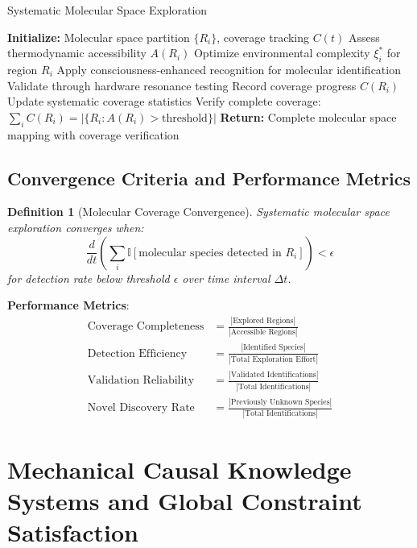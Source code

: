 \documentclass[11pt,a4paper]{article}
\newtheorem{definition}[theorem]{Definition}
\theoremstyle{remark}
\begin{document}
\begin{algorithm}
\caption{Systematic Molecular Space Exploration}
\begin{algorithmic}[1]
\State \textbf{Initialize:} Molecular space partition $\{R_i\}$, coverage tracking $C(t)$
    \State Assess thermodynamic accessibility $A(R_i)$
        \State Optimize environmental complexity $\xi_i^*$ for region $R_i$
        \State Apply consciousness-enhanced recognition for molecular identification
        \State Validate through hardware resonance testing
        \State Record coverage progress $C(R_i)$
    \EndIf
    \State Update systematic coverage statistics
\EndFor
\State Verify complete coverage: $\sum_i C(R_i) = |\{R_i : A(R_i) > \text{threshold}\}|$
\State \textbf{Return:} Complete molecular space mapping with coverage verification
\end{algorithmic}
\end{algorithm}

\subsection{Convergence Criteria and Performance Metrics}

\begin{definition}[Molecular Coverage Convergence]
Systematic molecular space exploration converges when:
$$\frac{d}{dt}\left(\sum_{i} \mathbb{I}[\text{molecular species detected in } R_i]\right) < \epsilon$$
for detection rate below threshold $\epsilon$ over time interval $\Delta t$.
\end{definition}

\textbf{Performance Metrics}:
\begin{align}
\text{Coverage Completeness} &= \frac{|\text{Explored Regions}|}{|\text{Accessible Regions}|}\\
\text{Detection Efficiency} &= \frac{|\text{Identified Species}|}{|\text{Total Exploration Effort}|}\\
\text{Validation Reliability} &= \frac{|\text{Validated Identifications}|}{|\text{Total Identifications}|}\\
\text{Novel Discovery Rate} &= \frac{|\text{Previously Unknown Species}|}{|\text{Total Identifications}|}
\end{align}

\section{Mechanical Causal Knowledge Systems and Global Constraint Satisfaction}
\end{document}
